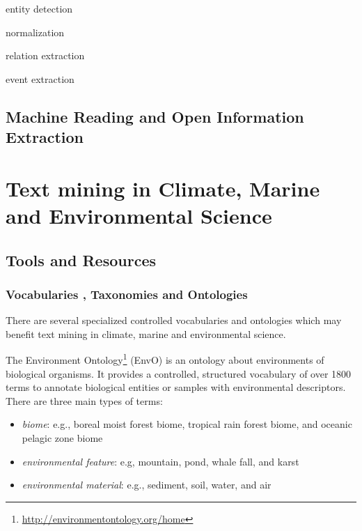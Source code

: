 \documentclass[11pt,oneside,a4paper]{report}
\begin{document}
entity detection

normalization

relation extraction

event extraction


\section{Machine Reading and Open Information Extraction}


\citet{Etzioni2011Search}




\chapter{Text mining in Climate, Marine and Environmental Science}



\section{Tools and Resources}

\subsection{Vocabularies , Taxonomies and Ontologies}

There are several specialized controlled vocabularies and ontologies which may benefit text mining in climate, marine and environmental science.
 
The Environment Ontology\footnote{\url{http://environmentontology.org/home}} (EnvO) is an ontology about environments  \citep{Buttigieg2013Environment} of biological organisms.
It provides a controlled, structured vocabulary of over 1800 terms to annotate biological entities or samples with environmental descriptors.
There are three main types of terms:

\begin{itemize}
\item \emph{biome}: e.g., boreal moist forest biome, tropical rain forest biome, and oceanic pelagic zone biome 
\item \emph{environmental feature}: e.g, mountain, pond, whale fall, and karst
\item \emph{environmental material}: e.g., sediment, soil, water, and air
\end{itemize}
\end{document}
